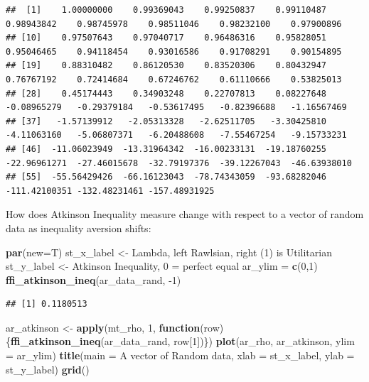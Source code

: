 \documentclass[
]{book}
\newenvironment{Shaded}{\begin{snugshade}}{\end{snugshade}}
\newcommand{\ControlFlowTok}[1]{\textcolor[rgb]{0.13,0.29,0.53}{\textbf{#1}}}
\newcommand{\DataTypeTok}[1]{\textcolor[rgb]{0.13,0.29,0.53}{#1}}
\newcommand{\DecValTok}[1]{\textcolor[rgb]{0.00,0.00,0.81}{#1}}
\newcommand{\KeywordTok}[1]{\textcolor[rgb]{0.13,0.29,0.53}{\textbf{#1}}}
\newcommand{\NormalTok}[1]{#1}
\newcommand{\StringTok}[1]{\textcolor[rgb]{0.31,0.60,0.02}{#1}}
\begin{document}
\begin{verbatim}
##  [1]    1.00000000    0.99369043    0.99250837    0.99110487    0.98943842    0.98745978    0.98511046    0.98232100    0.97900896
## [10]    0.97507643    0.97040717    0.96486316    0.95828051    0.95046465    0.94118454    0.93016586    0.91708291    0.90154895
## [19]    0.88310482    0.86120530    0.83520306    0.80432947    0.76767192    0.72414684    0.67246762    0.61110666    0.53825013
## [28]    0.45174443    0.34903248    0.22707813    0.08227648   -0.08965279   -0.29379184   -0.53617495   -0.82396688   -1.16567469
## [37]   -1.57139912   -2.05313328   -2.62511705   -3.30425810   -4.11063160   -5.06807371   -6.20488608   -7.55467254   -9.15733231
## [46]  -11.06023949  -13.31964342  -16.00233131  -19.18760255  -22.96961271  -27.46015678  -32.79197376  -39.12267043  -46.63938010
## [55]  -55.56429426  -66.16123043  -78.74343059  -93.68282046 -111.42100351 -132.48231461 -157.48931925
\end{verbatim}

How does Atkinson Inequality measure change with respect to a vector of random data as inequality aversion shifts:

\begin{Shaded}
\begin{Highlighting}[]
\KeywordTok{par}\NormalTok{(}\DataTypeTok{new=}\NormalTok{T)}
\NormalTok{st\_x\_label \textless{}{-}}\StringTok{ \textquotesingle{}Lambda, left Rawlsian, right (1) is Utilitarian\textquotesingle{}}
\NormalTok{st\_y\_label \textless{}{-}}\StringTok{ \textquotesingle{}Atkinson Inequality, 0 = perfect equal\textquotesingle{}}
\NormalTok{ar\_ylim =}\StringTok{ }\KeywordTok{c}\NormalTok{(}\DecValTok{0}\NormalTok{,}\DecValTok{1}\NormalTok{)}
\KeywordTok{ffi\_atkinson\_ineq}\NormalTok{(ar\_data\_rand, }\DecValTok{{-}1}\NormalTok{)}
\end{Highlighting}
\end{Shaded}

\begin{verbatim}
## [1] 0.1180513
\end{verbatim}

\begin{Shaded}
\begin{Highlighting}[]
\NormalTok{ar\_atkinson \textless{}{-}}\StringTok{ }\KeywordTok{apply}\NormalTok{(mt\_rho, }\DecValTok{1}\NormalTok{, }\ControlFlowTok{function}\NormalTok{(row)\{}\KeywordTok{ffi\_atkinson\_ineq}\NormalTok{(ar\_data\_rand, row[}\DecValTok{1}\NormalTok{])\})}
\KeywordTok{plot}\NormalTok{(ar\_rho, ar\_atkinson, }\DataTypeTok{ylim =}\NormalTok{ ar\_ylim)}
\KeywordTok{title}\NormalTok{(}\DataTypeTok{main =} \StringTok{\textquotesingle{}A vector of Random data\textquotesingle{}}\NormalTok{, }\DataTypeTok{xlab =}\NormalTok{ st\_x\_label, }\DataTypeTok{ylab =}\NormalTok{ st\_y\_label)}
\KeywordTok{grid}\NormalTok{()}
\end{Highlighting}
\end{Shaded}
\end{document}
